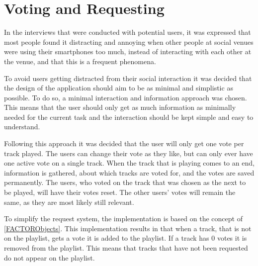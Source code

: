 \section{Voting and Requesting}
\label{VotingAndRequesting}
In the interviews that were conducted with potential users, it was expressed that most people found it distracting and annoying when other people at social venues were using their smartphones too much, instead of interacting with each other at the venue, and that this is a frequent phenomena. 

To avoid users getting distracted from their social interaction it was decided that the design of the application should aim to be as minimal and simplistic as possible. To do so, a minimal interaction and information approach was chosen. This means that the user should only get as much information as minimally needed for the current task and the interaction should be kept simple and easy to understand.

Following this approach it was decided that the user will only get one vote per track played.
The users can change their vote as they like, but can only ever have one active vote on a single track.
When the track that is playing comes to an end, information is gathered, about which tracks are voted for, and the votes are saved permanently.
The users, who voted on the track that was chosen as the next to be played, will have their votes reset. The other users’ votes will remain the same, as they are most likely still relevant.

To simplify the request system, the implementation is based on the concept of \cref{FACTORObjects}. This implementation results in that when a track, that is not on the playlist, gets a vote it is added to the playlist. If a track has 0 votes it is removed from the playlist. This means that tracks that have not been requested do not appear on the playlist.

